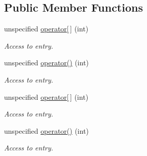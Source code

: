 \subsection*{Public Member Functions}
\begin{DoxyCompactItemize}
\item 
\hypertarget{structRFFGen_1_1Concepts_1_1VectorConcept_ae3c1eba9ae7c1789b0261b9c75b45451}{unspecified \hyperlink{structRFFGen_1_1Concepts_1_1VectorConcept_ae3c1eba9ae7c1789b0261b9c75b45451}{operator\mbox{[}$\,$\mbox{]}} (int)}\label{structRFFGen_1_1Concepts_1_1VectorConcept_ae3c1eba9ae7c1789b0261b9c75b45451}

\begin{DoxyCompactList}\small\item\em Access to entry. \end{DoxyCompactList}\item 
\hypertarget{structRFFGen_1_1Concepts_1_1VectorConcept_a1922a4ed887026d05dfc511132d8d0cb}{unspecified \hyperlink{structRFFGen_1_1Concepts_1_1VectorConcept_a1922a4ed887026d05dfc511132d8d0cb}{operator()} (int)}\label{structRFFGen_1_1Concepts_1_1VectorConcept_a1922a4ed887026d05dfc511132d8d0cb}

\begin{DoxyCompactList}\small\item\em Access to entry. \end{DoxyCompactList}\item 
\hypertarget{structRFFGen_1_1Concepts_1_1VectorConcept_ae3c1eba9ae7c1789b0261b9c75b45451}{unspecified \hyperlink{structRFFGen_1_1Concepts_1_1VectorConcept_ae3c1eba9ae7c1789b0261b9c75b45451}{operator\mbox{[}$\,$\mbox{]}} (int)}\label{structRFFGen_1_1Concepts_1_1VectorConcept_ae3c1eba9ae7c1789b0261b9c75b45451}

\begin{DoxyCompactList}\small\item\em Access to entry. \end{DoxyCompactList}\item 
\hypertarget{structRFFGen_1_1Concepts_1_1VectorConcept_a1922a4ed887026d05dfc511132d8d0cb}{unspecified \hyperlink{structRFFGen_1_1Concepts_1_1VectorConcept_a1922a4ed887026d05dfc511132d8d0cb}{operator()} (int)}\label{structRFFGen_1_1Concepts_1_1VectorConcept_a1922a4ed887026d05dfc511132d8d0cb}

\begin{DoxyCompactList}\small\item\em Access to entry. \end{DoxyCompactList}\end{DoxyCompactItemize}


